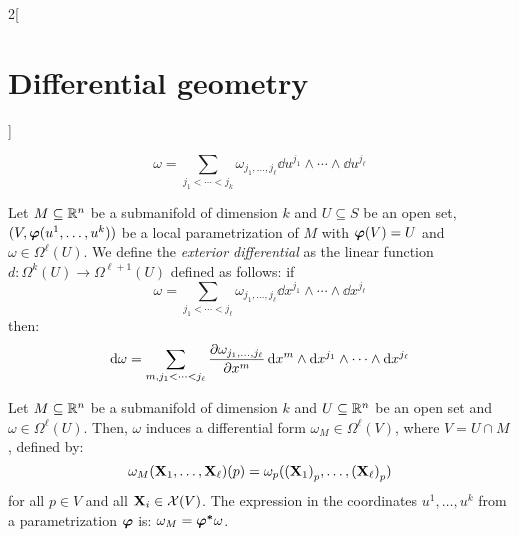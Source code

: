 \documentclass[../../../main.tex]{subfiles}
\begin{document}
\begin{multicols}{2}[\section{Differential geometry}]
\begin{definition}
    $$\omega=\sum_{j_1<\cdots<j_k}\omega_{j_1,\ldots,j_\ell}\dd{u^{j_1}}\wedge\cdots\wedge\dd{u^{j_\ell}}$$
  \end{definition}
  \begin{definition}
    Let $M\subseteq\mathbb{R}^n$ be a submanifold of dimension $k$ and $U\subseteq S$ be an open set, $(V,\boldsymbol{\mathrm{\varphi}}(u^1,\ldots,u^k))$ be a local parametrization of $M$ with $\boldsymbol{\mathrm{\varphi}}(V)=U$ and $\omega\in\Omega^\ell(U)$. We define the \emph{exterior differential} as the linear function $d:\Omega^k(U)\rightarrow\Omega^{\ell+1}(U)$ defined as follows: if $$\omega=\sum_{j_1<\cdots<j_\ell}\omega_{j_1,\ldots,j_\ell}\dd{x^{j_1}}\wedge\cdots\wedge\dd{x^{j_\ell}}$$
    then: $$\dd{\omega}=\sum_{m,j_1<\cdots<j_\ell}\pdv{\omega_{j_1,\ldots,j_\ell}}{x^m}\dd{x^m}\wedge\dd{x^{j_1}}\wedge\cdots\wedge\dd{x^{j_\ell}}$$
  \end{definition}
  \begin{proposition}
    Let $M\subseteq\mathbb{R}^n$ be a submanifold of dimension $k$ and $U\subseteq \mathbb{R}^n$ be an open set and $\omega\in\Omega^\ell(U)$. Then, $\omega$ induces a differential form $\omega_M\in\Omega^\ell(V)$, where $V=U\cap M$, defined by: $$\omega_M(\boldsymbol{\mathrm{X}}_1,\ldots,\boldsymbol{\mathrm{X}}_\ell)(p)=\omega_p({(\boldsymbol{\mathrm{X}}_1)}_p,\ldots,{(\boldsymbol{\mathrm{X}}_\ell)}_p)$$
    for all $p\in V$ and all $\boldsymbol{\mathrm{X}}_i\in\mathcal{X}(V)$.
    The expression in the coordinates $u^1,\ldots,u^k$ from a parametrization $\boldsymbol{\mathrm{\varphi}}$ is: $\omega_M=\boldsymbol{\mathrm{\varphi^*}}\omega$.
  \end{proposition}

\end{multicols}
\end{document}

